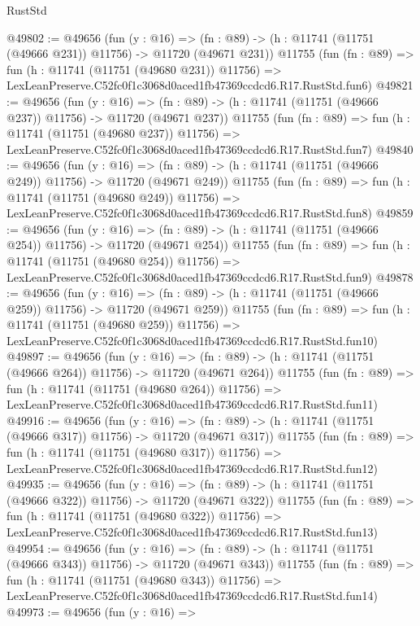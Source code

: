 \begin{lexlean}{RustStd}
\begin{coremodule}
@49802 := @49656
    (fun (y : @16) =>
    (fn : @89) -> (h : @11741 (@11751 (@49666 @231)) @11756) -> @11720 (@49671 @231))
    @11755
    (fun (fn : @89) =>
    fun (h : @11741 (@11751 (@49680 @231)) @11756) =>
    LexLeanPreserve.C52fc0f1c3068d0aced1fb47369ccdcd6.R17.RustStd.fun6)
@49821 := @49656
    (fun (y : @16) =>
    (fn : @89) -> (h : @11741 (@11751 (@49666 @237)) @11756) -> @11720 (@49671 @237))
    @11755
    (fun (fn : @89) =>
    fun (h : @11741 (@11751 (@49680 @237)) @11756) =>
    LexLeanPreserve.C52fc0f1c3068d0aced1fb47369ccdcd6.R17.RustStd.fun7)
@49840 := @49656
    (fun (y : @16) =>
    (fn : @89) -> (h : @11741 (@11751 (@49666 @249)) @11756) -> @11720 (@49671 @249))
    @11755
    (fun (fn : @89) =>
    fun (h : @11741 (@11751 (@49680 @249)) @11756) =>
    LexLeanPreserve.C52fc0f1c3068d0aced1fb47369ccdcd6.R17.RustStd.fun8)
@49859 := @49656
    (fun (y : @16) =>
    (fn : @89) -> (h : @11741 (@11751 (@49666 @254)) @11756) -> @11720 (@49671 @254))
    @11755
    (fun (fn : @89) =>
    fun (h : @11741 (@11751 (@49680 @254)) @11756) =>
    LexLeanPreserve.C52fc0f1c3068d0aced1fb47369ccdcd6.R17.RustStd.fun9)
@49878 := @49656
    (fun (y : @16) =>
    (fn : @89) -> (h : @11741 (@11751 (@49666 @259)) @11756) -> @11720 (@49671 @259))
    @11755
    (fun (fn : @89) =>
    fun (h : @11741 (@11751 (@49680 @259)) @11756) =>
    LexLeanPreserve.C52fc0f1c3068d0aced1fb47369ccdcd6.R17.RustStd.fun10)
@49897 := @49656
    (fun (y : @16) =>
    (fn : @89) -> (h : @11741 (@11751 (@49666 @264)) @11756) -> @11720 (@49671 @264))
    @11755
    (fun (fn : @89) =>
    fun (h : @11741 (@11751 (@49680 @264)) @11756) =>
    LexLeanPreserve.C52fc0f1c3068d0aced1fb47369ccdcd6.R17.RustStd.fun11)
@49916 := @49656
    (fun (y : @16) =>
    (fn : @89) -> (h : @11741 (@11751 (@49666 @317)) @11756) -> @11720 (@49671 @317))
    @11755
    (fun (fn : @89) =>
    fun (h : @11741 (@11751 (@49680 @317)) @11756) =>
    LexLeanPreserve.C52fc0f1c3068d0aced1fb47369ccdcd6.R17.RustStd.fun12)
@49935 := @49656
    (fun (y : @16) =>
    (fn : @89) -> (h : @11741 (@11751 (@49666 @322)) @11756) -> @11720 (@49671 @322))
    @11755
    (fun (fn : @89) =>
    fun (h : @11741 (@11751 (@49680 @322)) @11756) =>
    LexLeanPreserve.C52fc0f1c3068d0aced1fb47369ccdcd6.R17.RustStd.fun13)
@49954 := @49656
    (fun (y : @16) =>
    (fn : @89) -> (h : @11741 (@11751 (@49666 @343)) @11756) -> @11720 (@49671 @343))
    @11755
    (fun (fn : @89) =>
    fun (h : @11741 (@11751 (@49680 @343)) @11756) =>
    LexLeanPreserve.C52fc0f1c3068d0aced1fb47369ccdcd6.R17.RustStd.fun14)
@49973 := @49656
    (fun (y : @16) =>

\end{coremodule}
\end{lexlean}
